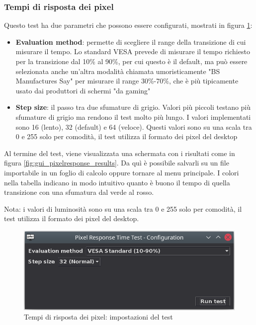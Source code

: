 \subsubsection{Tempi di risposta dei pixel}
Questo test ha due parametri che possono essere configurati, mostrati in figura \ref{fig:gui_pixelresponse_settings}:\begin{itemize}
	\item \textbf{Evaluation method}: permette di scegliere il range della transizione di cui misurare il tempo. Lo standard VESA prevede di misurare il tempo richiesto per la transizione dal 10\% al 90\%, per cui questo è il default, ma può essere selezionata anche un'altra modalità chiamata umoristicamente "BS Manufactures Say" per misurare il range 30\%-70\%, che è più tipicamente usato dai produttori di schermi "da gaming"
	\item \textbf{Step size}: il passo tra due sfumature di grigio. Valori più piccoli testano più sfumature di grigio ma rendono il test molto più lungo. I valori implementati sono 16 (lento), 32 (default) e 64 (veloce). Questi valori sono su una scala tra 0 e 255 solo per comodità, il test utilizza il formato dei pixel del desktop
\end{itemize}

Al termine del test, viene visualizzata una schermata con i risultati come in figura \ref{fig:gui_pixelresponse_results}. Da quì è possibile salvarli su un file importabile in un foglio di calcolo oppure tornare al menu principale. I colori nella tabella indicano in modo intuitivo quanto è buono il tempo di quella transizione con una sfumatura dal verde al rosso.

Nota: i valori di luminosità sono su una scala tra 0 e 255 solo per comodità, il test utilizza il formato dei pixel del desktop.

\begin{figure}[H]
	\centering
	\includegraphics[width=.8\textwidth]{Applicazione_files/gui_pixelresponse_settings.png}
	\caption{Tempi di risposta dei pixel: impostazioni del test}
	\label{fig:gui_pixelresponse_settings}
\end{figure}

